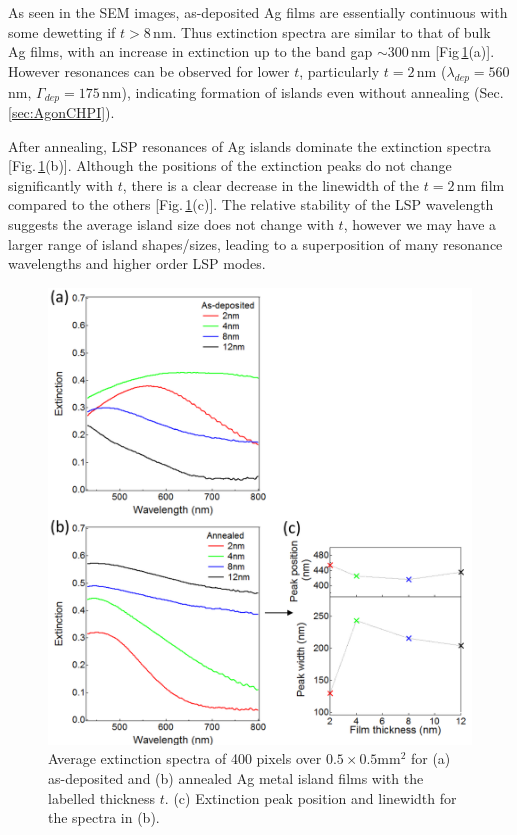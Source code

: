 As seen in the SEM images, as-deposited Ag films are essentially continuous with some dewetting if $t>8$\,nm. Thus extinction spectra are similar to that of bulk Ag films, with an increase in extinction up to the band gap $\sim300$\,nm [Fig\,\ref{6Fig6}(a)]. However resonances can be observed for lower $t$, particularly $t=2$\,nm ($\lambda_{dep} = 560$\,nm, $\Gamma_{dep} = 175$\,nm), indicating formation of islands even without annealing (Sec.\,\ref{sec:AgonCHPI}). 

After annealing, LSP resonances of Ag islands dominate the extinction spectra [Fig.\,\ref{6Fig6}(b)]. Although the positions of the extinction peaks do not change significantly with $t$, there is a clear decrease in the linewidth of the $t=2$\,nm film compared to the others [Fig.\,\ref{6Fig6}(c)]. The relative stability of the LSP wavelength suggests the average island size does not change with $t$, however we may have a larger range of island shapes/sizes, leading to a superposition of many resonance wavelengths and higher order LSP modes.
\begin{figure}[h!] 
\centering    
\includegraphics[width=\textwidth]{Fig6}
\caption{Average extinction spectra of 400 pixels over $0.5\times0.5$mm$^2$ for (a) as-deposited and (b) annealed Ag metal island films with the labelled thickness $t$. (c) Extinction peak position and linewidth for the spectra in (b).}
\label{6Fig6}
\end{figure}

